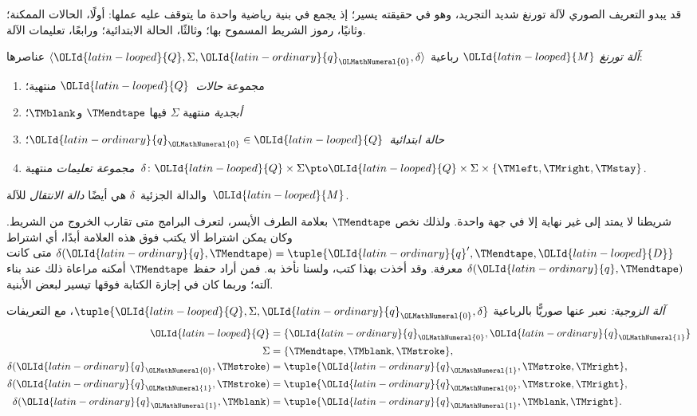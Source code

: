 \documentclass[../../../include/open-logic-section]{subfiles}
\begin{document}

\begin{explain}
قد يبدو التعريف الصوري لآلة تورنغ شديد التجريد، وهو في حقيقته يسير؛ إذ يجمع في بنية رياضية واحدة ما يتوقف عليه عملها: أولًا، الحالات الممكنة؛ وثانيًا، رموز الشريط المسموح بها؛ وثالثًا، الحالة الابتدائية؛ ورابعًا، تعليمات الآلة.
\end{explain}

\begin{defn}
\emph{آلة تورنغ} $\OLId{latin-looped}{M}$ رباعية $\langle \OLId{latin-looped}{Q},\Sigma,\OLId{latin-ordinary}{q}_\OLMathNumeral{0},\delta\rangle$ عناصرها:
\begin{enumerate}
\item مجموعة \emph{حالات}~$\OLId{latin-looped}{Q}$ منتهية؛
\item \emph{أبجدية} منتهية $\Sigma$ فيها $\TMendtape$ و$\TMblank$؛
\item \emph{حالة ابتدائية}~$\OLId{latin-ordinary}{q}_\OLMathNumeral{0} \in \OLId{latin-looped}{Q}$؛
\item \emph{مجموعة تعليمات} منتهية~$\delta\colon \OLId{latin-looped}{Q} \times \Sigma
  \pto \OLId{latin-looped}{Q} \times \Sigma \times \{\TMleft,\TMright,\TMstay\}$.
\end{enumerate}
والدالة الجزئية~$\delta$ هي أيضًا \emph{دالة الانتقال} للآلة~$\OLId{latin-looped}{M}$.
\end{defn}

\begin{explain}
شريطنا لا يمتد إلى غير نهاية إلا في جهة واحدة. ولذلك نخص $\TMendtape$ بعلامة الطرف الأيسر، لتعرف البرامج متى تقارب الخروج من الشريط. وكان يمكن اشتراط ألا يكتب فوق هذه العلامة أبدًا، أي اشتراط $\delta(\OLId{latin-ordinary}{q},\TMendtape)=\tuple{\OLId{latin-ordinary}{q}',\TMendtape,\OLId{latin-looped}{D}}$ متى كانت $\delta(\OLId{latin-ordinary}{q},\TMendtape)$ معرفة. وقد أخذت بهذا كتب، ولسنا نأخذ به. فمن أراد حفظ $\TMendtape$ أمكنه مراعاة ذلك عند بناء آلته؛ وربما كان في إجازة الكتابة فوقها تيسير لبعض الأبنية.
\end{explain}

\begin{ex}
\emph{آلة الزوجية:} نعبر عنها صوريًّا بالرباعية $\tuple{\OLId{latin-looped}{Q},\Sigma,\OLId{latin-ordinary}{q}_\OLMathNumeral{0},\delta}$، مع التعريفات
\begin{align*}
\OLId{latin-looped}{Q} & = \{ \OLId{latin-ordinary}{q}_\OLMathNumeral{0}, \OLId{latin-ordinary}{q}_\OLMathNumeral{1} \} \\
\Sigma & = \{ \TMendtape, \TMblank, \TMstroke \}, \\
\delta(\OLId{latin-ordinary}{q}_\OLMathNumeral{0}, \TMstroke) & = \tuple{\OLId{latin-ordinary}{q}_\OLMathNumeral{1}, \TMstroke, \TMright},\\
\delta(\OLId{latin-ordinary}{q}_\OLMathNumeral{1}, \TMstroke) & = \tuple{\OLId{latin-ordinary}{q}_\OLMathNumeral{0}, \TMstroke, \TMright},\\
\delta(\OLId{latin-ordinary}{q}_\OLMathNumeral{1}, \TMblank)  & = \tuple{\OLId{latin-ordinary}{q}_\OLMathNumeral{1}, \TMblank, \TMright}.
\end{align*}
\end{ex}
\end{document}
